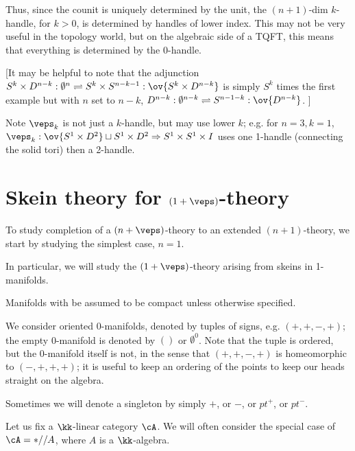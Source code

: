 \documentclass[12pt]{article}
\newcommand{\disk}[1]{{D^{#1}}}
\newcommand{\sphr}[1]{{S^{#1}}}
\newcommand{\empt}[1]{{\emptyset^{#1}}}
\begin{document}
Thus, since the counit is uniquely determined by the unit,
the $(n+1)$-dim $k$-handle, for $k > 0$,
is determined by handles of lower index.
This may not be very useful in the topology world,
but on the algebraic side of a TQFT,
this means that everything is determined by the 0-handle.



[It may be helpful to note that the adjunction
$\sphr{k} \times \disk{n-k} : \empt{n} \rightleftharpoons
	\sphr{k} \times \sphr{n-k-1} : \ov{\sphr{k} \times \disk{n-k}}$
is simply $\sphr{k}$ times
the first example but with $n$ set to $n-k$,
$\disk{n-k} : \empt{n-k} \rightleftharpoons
	\sphr{n-1-k}: \ov{\disk{n-k}}$.
]


Note $\veps_k$ is not just a $k$-handle,
but may use lower $k$;
e.g. for $n = 3, k = 1$,
$\veps_k: \ov{S^1 \times D^2} \sqcup S^1 \times D^2 \Rightarrow
S^1 \times S^1 \times I$
uses one 1-handle (connecting the solid tori)
then a 2-handle.



\section{Skein theory for $(1+\veps)$-theory}

To study completion of a $(n+\veps)$-theory
to an extended $(n+1)$-theory,
we start by studying the simplest case, $n = 1$.

In particular, we will study the $(1+\veps)$-theory
arising from skeins in 1-manifolds.

Manifolds with be assumed to be compact
unless otherwise specified.

We consider oriented 0-manifolds,
denoted by tuples of signs, e.g. $(+,+,-,+)$;
the empty 0-manifold is denoted by $()$ or $\empt{0}$.
Note that the tuple is ordered, but the 0-manifold itself
is not, in the sense that
$(+,+,-,+)$ is homeomorphic to $(-,+,+,+)$;
it is useful to keep an ordering of the points
to keep our heads straight on the algebra.

Sometimes we will denote a singleton by simply $+$,
or $-$, or $pt^+$, or $pt^-$.

Let us fix a $\kk$-linear category $\cA$.
We will often consider the special case of
$\cA = *//A$, where $A$ is a $\kk$-algebra.
\end{document}
